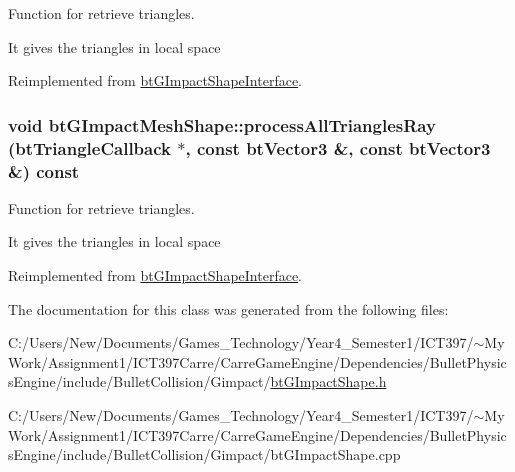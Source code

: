 Function for retrieve triangles. 

It gives the triangles in local space 

Reimplemented from \hyperlink{classbt_g_impact_shape_interface_2faf9adce39854a9a66dd658f646be25}{btGImpactShapeInterface}.\hypertarget{classbt_g_impact_mesh_shape_80b60d4ca87b2739b2389258e901900d}{
\subsubsection[processAllTrianglesRay]{\setlength{\rightskip}{0pt plus 5cm}void btGImpactMeshShape::processAllTrianglesRay ({\bf btTriangleCallback} $\ast$, \/  const btVector3 \&, \/  const btVector3 \&) const}}
\label{classbt_g_impact_mesh_shape_80b60d4ca87b2739b2389258e901900d}


Function for retrieve triangles. 

It gives the triangles in local space 

Reimplemented from \hyperlink{classbt_g_impact_shape_interface_646ad13b4aa116d58df110c2f407e5a8}{btGImpactShapeInterface}.

The documentation for this class was generated from the following files:\begin{CompactItemize}
\item 
C:/Users/New/Documents/Games\_\-Technology/Year4\_\-Semester1/ICT397/$\sim$My Work/Assignment1/ICT397Carre/CarreGameEngine/Dependencies/BulletPhysicsEngine/include/BulletCollision/Gimpact/\hyperlink{bt_g_impact_shape_8h}{btGImpactShape.h}\item 
C:/Users/New/Documents/Games\_\-Technology/Year4\_\-Semester1/ICT397/$\sim$My Work/Assignment1/ICT397Carre/CarreGameEngine/Dependencies/BulletPhysicsEngine/include/BulletCollision/Gimpact/btGImpactShape.cpp\end{CompactItemize}

